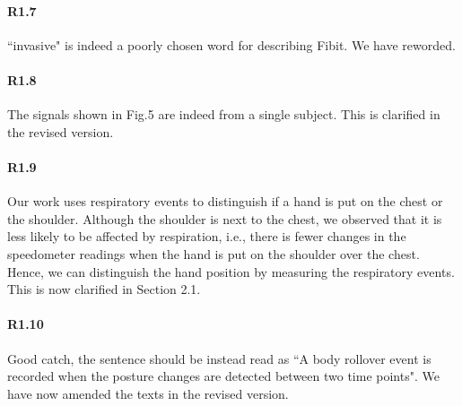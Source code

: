\paragraph{R1.7} ``invasive" is indeed a poorly chosen word for describing Fibit. We have reworded.
\vspace{-2mm}
\paragraph{R1.8} The signals shown in Fig.5 are indeed from a single subject. This is clarified in the revised version.
\vspace{-2mm}
\paragraph{R1.9} Our work uses respiratory events to distinguish if a hand is put on the chest or the shoulder. Although the shoulder is
next to the chest, we observed that it is less likely to be affected by respiration, i.e., there is fewer changes in the speedometer
readings when the hand is put on the shoulder over the chest. Hence, we can distinguish the hand position by measuring the respiratory
events. This is now clarified in Section 2.1.




\paragraph{R1.10} Good catch, the sentence should be instead read as ``A body rollover event is recorded when the posture changes are detected between
two time points". We have now amended the texts in the revised version.


